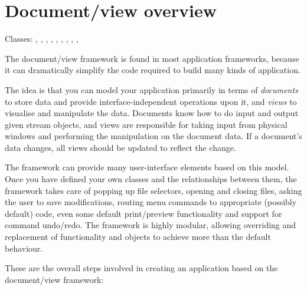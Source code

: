 
\section{Document/view overview}\label{docviewoverview}

Classes: , , ,\rtfsp
{}, , ,
\rtfsp{}, ,
\rtfsp{}, 

The document/view framework is found in most application frameworks, because it
can dramatically simplify the code required to build many kinds of application.

The idea is that you can model your application primarily in terms of {\it documents} to store data
and provide interface-independent operations upon it, and {\it views} to visualise and manipulate
the data. Documents know how to do input and output given stream objects, and views are responsible
for taking input from physical windows and performing the manipulation on the document data.
If a document's data changes, all views should be updated to reflect the change.

The framework can provide many user-interface elements based on this model. Once you have defined
your own classes and the relationships between them, the framework takes care
of popping up file selectors, opening and closing files, asking the user to save
modifications, routing menu commands to appropriate (possibly default) code, even
some default print/preview functionality and support for command undo/redo.
The framework is highly modular, allowing overriding and replacement of functionality
and objects to achieve more than the default behaviour.

These are the overall steps involved in creating an application based on the document/view framework:

